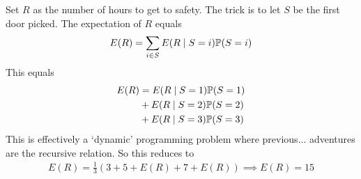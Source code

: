 \begin{solution}
    Set $R$ as the number of hours to get to safety. The trick is to let $S$ be the first door picked. The expectation of $R$ equals
    \begin{align}
        E(R) = \sum_{i \in S} E(R \mid S = i) \mathbb{P}(S = i)
    \end{align}
    This equals
    \begin{align}
        E(R) &= E(R \mid S = 1) \mathbb{P}(S = 1)\\\
        &+ E(R \mid S = 2) \mathbb{P}(S = 2) \notag\\
        &+ E(R \mid S = 3) \mathbb{P}(S = 3) \notag
    \end{align}
    This is effectively a `dynamic' programming problem where previous... adventures are the recursive relation. So this reduces to
    \begin{align}
        E(R) = \frac{1}{3}\left( 3 + 5 + E(R) + 7 + E(R) \right) \implies E(R) = 15
    \end{align}
\end{solution}

